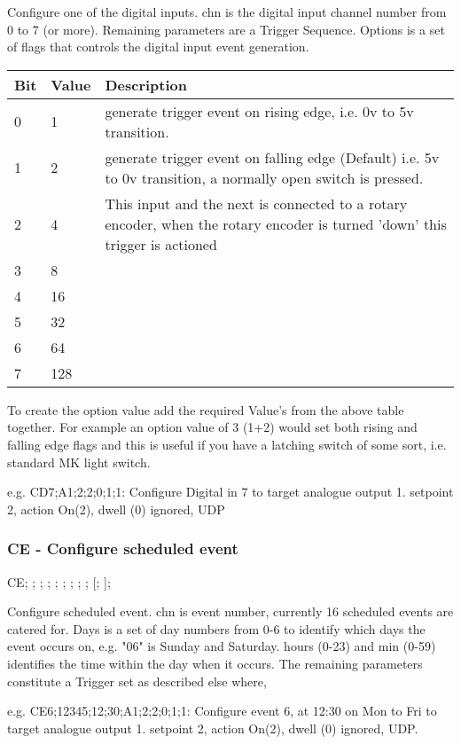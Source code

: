 Configure one of the digital inputs.
chn is the digital input channel number from 0 to 7 (or more). Remaining parameters are a Trigger Sequence.
Options is a set of flags that controls the digital input event generation.

\begin{tabular}{l|l|p{12cm}}
Bit&Value&Description\\
\hline
0&1&generate trigger event on rising edge, i.e. 0v to 5v transition.\\
1&2&generate trigger event on falling edge (Default) i.e. 5v to 0v transition, a normally open switch is pressed.\\
2&4&This input and the next is connected to a rotary encoder, when the rotary encoder is turned 'down' this trigger is actioned\\
3&8&\\
4&16&\\
5&32&\\
6&64&\\
7&128&\\
\end{tabular}

To create the option value add the required Value's from the above table together.
For example an option value of 3 (1+2) would set both rising and falling edge flags and this is useful if you have a latching switch of some sort, 
i.e. standard MK light switch.

e.g.
CD7;A1;2;2;0;1;1:
Configure Digital in 7 to target analogue output 1. setpoint 2, action On(2), dwell (0) ignored, UDP

\subsubsection{CE - Configure scheduled event}
CE; ; ; ; ; ; ; ; ; [; ];

Configure scheduled event.
chn is event number, currently 16 scheduled events are catered for. Days is a set of day numbers 
from 0-6 to identify which days the event occurs on, e.g. "06" is Sunday and Saturday. hours (0-23) 
and min (0-59) identifies the time within the day when it occurs. 
The remaining parameters constitute a Trigger set as described else where,

e.g.
CE6;12345;12;30;A1;2;2;0;1;1:
Configure event 6, at 12:30 on Mon to Fri to target analogue output 1. setpoint 2, action On(2), dwell (0) ignored, UDP. 

